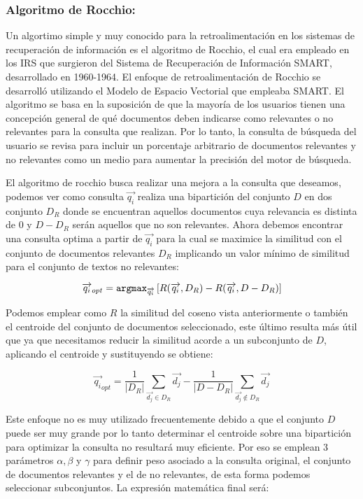 \documentclass[runningheads,a4paper]{llncs}
\begin{document}
\subsubsection*{Algoritmo de Rocchio:} Un algortimo simple y muy conocido para la retroalimentación en los sistemas de recuperación de información es el algoritmo de Rocchio, el cual era empleado en los IRS que surgieron del Sistema de Recuperación de Información SMART, desarrollado en 1960-1964. El enfoque de retroalimentación de Rocchio se desarrolló utilizando el Modelo de Espacio Vectorial que empleaba SMART. El algoritmo se basa en la suposición de que la mayoría de los usuarios tienen una concepción general de qué documentos deben indicarse como relevantes o no relevantes para la consulta que realizan. Por lo tanto, la consulta de búsqueda del usuario se revisa para incluir un porcentaje arbitrario de documentos relevantes y no relevantes como un medio para aumentar la precisión del motor de búsqueda.

El algoritmo de rocchio busca realizar una mejora a la consulta que deseamos, podemos ver como consulta $\overrightarrow{q_i}$ realiza una bipartición del conjunto $D$ en dos conjunto $D_R$ donde se encuentran aquellos documentos cuya relevancia es distinta de 0 y $D - D_R$ serán aquellos que no son relevantes. Ahora debemos encontrar una consulta optima a partir de $\overrightarrow{q_i}$ para la cual se maximice la similitud con el conjunto de documentos relevantes $D_R$ implicando un valor mínimo de similitud para el conjunto de textos no relevantes:

\begin{equation}
	\overrightarrow{{q_i}}_{opt} = \verb*|argmax|_{\overrightarrow{q_i}} \left[ R(\overrightarrow{q_i}, D_R) - R(\overrightarrow{q_i}, D - D_R) \right] 
\end{equation}

Podemos emplear como $R$ la similitud del coseno vista anteriormente o también el centroide del conjunto de documentos seleccionado, este último resulta más útil que ya que necesitamos reducir la similitud acorde a un subconjunto de $D$, aplicando el centroide y sustituyendo se obtiene:

\begin{equation}
	\overrightarrow{{q_i}}_{opt} = \frac{1}{|D_R|} \sum_{\overrightarrow{d_j} \in D_R} \overrightarrow{d_j} - \frac{1}{|D - D_R|} \sum_{\overrightarrow{d_j} \notin D_R} \overrightarrow{d_j} 
\end{equation}

Este enfoque no es muy utilizado frecuentemente debido a que el conjunto $D$ puede ser muy grande por lo tanto determinar el centroide sobre una bipartición para optimizar la consulta no resultará muy eficiente. Por eso se emplean 3 parámetros $\alpha, \beta $ y $\gamma$  para definir peso asociado a la consulta original, el conjunto de documentos relevantes y el de no relevantes, de esta forma podemos seleccionar subconjuntos. La expresión matemática final será:
\end{document}
